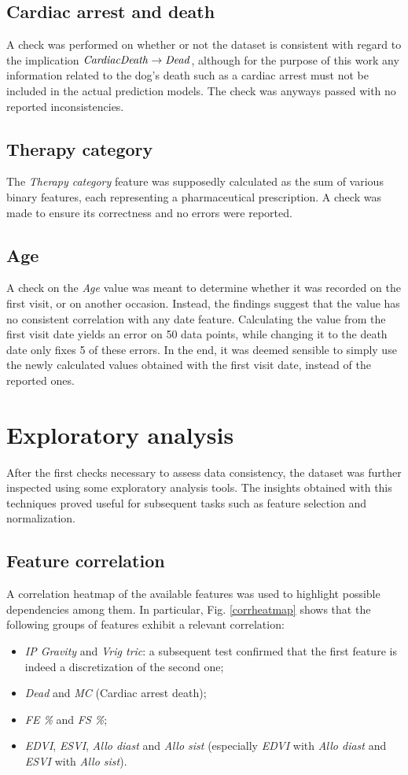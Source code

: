 \documentclass[12pt]{report}
\begin{document}
\subsection*{Cardiac arrest and death}
A check was performed on whether or not the dataset is consistent with regard to the implication $ \text{\emph{CardiacDeath}} \rightarrow \text{\emph{Dead}} $, although for the purpose of this work any information related to the dog's death such as a cardiac arrest must not be included in the actual prediction models. The check was anyways passed with no reported inconsistencies.
\subsection*{Therapy category}
The \textit{Therapy category} feature was supposedly calculated as the sum of various binary features, each representing a pharmaceutical prescription. A check was made to ensure its correctness and no errors were reported.
\subsection*{Age}
A check on the \textit{Age} value was meant to determine whether it was recorded on the first visit, or on another occasion. Instead, the findings suggest that the value has no consistent correlation with any date feature. Calculating the value from the first visit date yields an error on 50 data points, while changing it to the death date only fixes 5 of these errors. In the end, it was deemed sensible to simply use the newly calculated values obtained with the first visit date, instead of the reported ones.

\section{Exploratory analysis} \label{explanal}
After the first checks necessary to assess data consistency, the dataset was further inspected using some exploratory analysis tools. The insights obtained with this techniques proved useful for subsequent tasks such as feature selection and normalization.
\subsection*{Feature correlation}
A correlation heatmap of the available features was used to highlight possible dependencies among them. In particular, Fig. \ref{corrheatmap} shows that the following groups of features exhibit a relevant correlation:
\begin{itemize}
\item \textit{IP Gravity} and \textit{Vrig tric}: a subsequent test confirmed that the first feature is indeed a discretization of the second one;
\item \textit{Dead} and \textit{MC} (Cardiac arrest death);
\item \textit{FE \%} and \textit{FS \%};
\item \textit{EDVI}, \textit{ESVI}, \textit{Allo diast} and \textit{Allo sist} (especially \textit{EDVI} with \textit{Allo diast} and \textit{ESVI} with \textit{Allo sist}).
\end{itemize}
\end{document}
